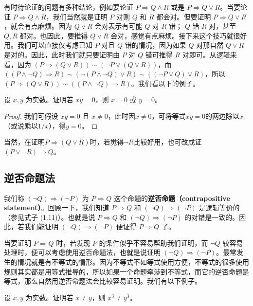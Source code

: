 有时待论证的问题有多种结论，例如要论证 $P \Rightarrow Q \land R$ 或是 $P \Rightarrow Q \lor R$。当要论证 $P \Rightarrow Q \land R$，我们当然就是证明 $P$ 对则 $Q$ 和 $R$ 都会对。但要证明 $P \Rightarrow Q \lor R$，就会有点麻烦。因为 $Q \lor R$ 会对表示有可能 $Q$ 对 $R$ 错； $Q$ 错 $R$ 对，甚至 $Q, R$ 都对。也因此，要推得 $Q \lor R$ 会对，感觉有点麻烦。接下来这个技巧就很好用。我们可以直接仅考虑已知 $P$ 对且 $Q$ 错的情况，因为如果 $Q$ 对那自然 $Q \lor R$ 是对的。因此，此时我们就只要证明由 $P$ 对 $Q$ 错可推得 $R$ 对即可。从逻辑来看，因为 $(P \Rightarrow (Q \lor R)) \sim (\neg P \lor (Q \lor R))$，而 $((P \land \neg Q) \Rightarrow R) \sim (\neg (P \land \neg Q) \lor R) \sim ((\neg P \lor Q) \lor R)$，所以 $(P \Rightarrow (Q \lor R)) \sim ((P \land \neg Q) \Rightarrow R)$。我们看以下的例子。

\begin{example}
设 $x, y$ 为实数。证明若 $xy = 0$，则 $x = 0$ 或 $y = 0$。
\end{example}

\begin{proof}
我们可假设 $xy = 0$ 且 $x \ne 0$，此时因$x \ne 0$，可将等式$xy=0$的两边除以$x$（或说乘以$1/x$），得$y = 0$。
\end{proof}

当然，在证明$P\Rightarrow (Q\lor R)$时，若觉得$\neg R$比较好用，也可改成证$(P\lor \neg R)\Rightarrow Q$。

\subsection{逆否命题法}

我们称 $(\neg Q) \Rightarrow (\neg P)$ 为 $P \Rightarrow Q$ 这个命题的\textbf{逆否命题（contrapositive statement）}。回顾一下，我们知道 $P \Rightarrow Q$ 和 $(\neg Q) \Rightarrow (\neg P)$ 是逻辑等价的（参见式子 (1.11)）。也就是说 $P \Rightarrow Q$ 和 $(\neg Q) \Rightarrow (\neg P)$ 的对错是一致的。因此，若我们能证明 $(\neg Q) \Rightarrow (\neg P)$ 便证得 $P \Rightarrow Q$ 了。

当要证明 $P \Rightarrow Q$ 时，若发现 $P$ 的条件似乎不容易帮助我们证明，而 $\neg Q$ 较容易处理时，便可以考虑使用逆否命题法，也就是说证明 $(\neg Q) \Rightarrow (\neg P)$。最常发生的情况就是有不等式的情形。因为不等式不如等式使用方便，不等式的很多使用规则其实都是用等式推导的，所以如果一个命题牵涉到不等式，而它的逆否命题是等式，那么自然用逆否命题法会比较容易证明。我们有以下例子。

\begin{example}
设 $x, y$ 为实数。证明若 $x \neq y$，则 $x^3 \neq y^3$。
\end{example}

